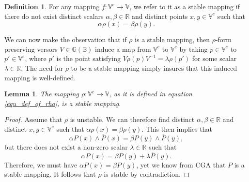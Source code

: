 \documentclass{birkjour}
\newtheorem{lem}[thm]{Lemma}
\theoremstyle{definition}
\newtheorem{defn}[thm]{Definition}
\theoremstyle{remark}
\numberwithin{equation}{section}
\newcommand{\G}{\mathbb{G}}
\newcommand{\V}{\mathbb{V}}
\newcommand{\R}{\mathbb{R}}
\newcommand{\B}{\mathbb{B}}
\begin{document}
\begin{defn}\label{def_stable_mapping}
For any mapping $f:\V^e\to\V$, we refer to it as a stable mapping
if there do not exist distinct scalars $\alpha,\beta\in\R$ and
distinct points $x,y\in\V^e$ such that
\begin{equation}
\alpha\rho(x)=\beta\rho(y).
\end{equation}
\end{defn}

We can now make the observation that if $\rho$ is a stable mapping,
then $\rho$-form preserving versors $V\in\G(\B)$ induce a map from $\V^e$ to $\V^e$ by
taking $p\in\V^e$ to $p'\in\V^e$, where $p'$ is the point satisfying
$V\rho(p)V^{-1}=\lambda\rho(p')$ for some scalar $\lambda\in\R$.
The need for $\rho$ to be a stable mapping simply insures that this
induced mapping is well-defined.

\begin{lem}
The mapping $\rho:\V^e\to\V$, as it is defined in equation \eqref{equ_def_of_rho},
is a stable mapping.
\end{lem}
\begin{proof}
Assume that $\rho$ is unstable.  We can therefore find distinct $\alpha,\beta\in\R$ and distinct $x,y\in\V^e$
such that $\alpha\rho(x)=\beta\rho(y)$.  This then implies that
\begin{equation}
\alpha P(x)\wedge\overline{P}(x) = \beta P(y)\wedge\overline{P}(y),
\end{equation}
but there does not exist a non-zero scalar $\lambda\in\R$ such that
\begin{equation}
\alpha P(x) = \beta P(y) + \lambda\overline{P}(y).
\end{equation}
Therefore, we must have $\alpha P(x)=\beta P(y)$, yet we know
from CGA that $P$ is a stable mapping.  It follows that $\rho$ is stable by contradiction.
\end{proof}
\end{document}
